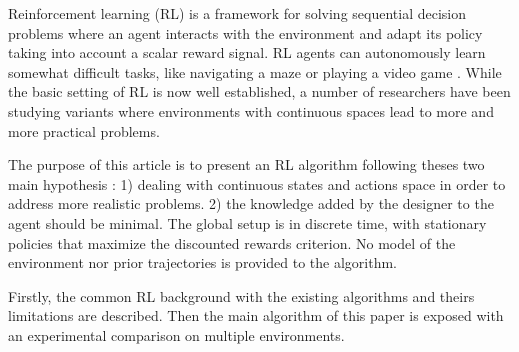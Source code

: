 Reinforcement learning (RL) \cite{Sutton1998} is a framework for solving sequential decision
problems where an agent interacts with the environment and adapt its policy
taking into account a scalar reward signal. RL agents can autonomously
learn somewhat difficult tasks, like navigating a maze or playing a video game \cite{Tesauro1994}.
While the basic setting of RL is now well established, a number of researchers have been
studying variants where environments with continuous spaces lead to more and more practical problems.

The purpose of this article is to present an RL algorithm following theses two main hypothesis :
1) dealing with continuous states and actions space in order to address more realistic problems.
2) the knowledge added by the designer to the agent should be minimal.
The global setup is in discrete time, with stationary policies that maximize the
discounted rewards criterion.
No model of the environment nor prior trajectories is provided to the algorithm.



Firstly, the common RL background with the existing algorithms and theirs limitations are described.
Then the main algorithm of this paper is exposed with an experimental comparison on multiple environments.
